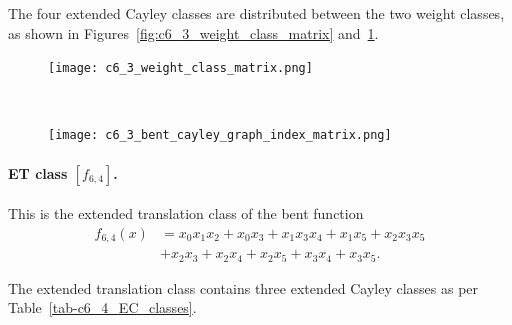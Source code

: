 \documentclass[12pt,a4paper]{article}
\begin{document}
The four extended Cayley classes are distributed between the two weight classes,
as shown in Figures~\ref{fig:c6_3_weight_class_matrix} and~\ref{fig:c6_3_bent_cayley_graph_index_matrix}.

\begin{figure}[!bhpt] %
\centering
\begin{minipage}{.48\textwidth}
  \centering
  \texttt{[image: c6\_3\_weight\_class\_matrix.png]}
  \label{fig:c6_3_weight_class_matrix}
\end{minipage}%
~~~~
\begin{minipage}{.48\textwidth}
  \centering
  \texttt{[image: c6\_3\_bent\_cayley\_graph\_index\_matrix.png]}
  \label{fig:c6_3_bent_cayley_graph_index_matrix}
\end{minipage}
\end{figure}


\paragraph*{ET class $[f_{6,4}]$.}
%
This is the extended translation class of the bent function
\begin{align*}
f_{6,4}(x) &= x_{0} x_{1} x_{2} + x_{0} x_{3} + x_{1} x_{3} x_{4} + x_{1} x_{5} + x_{2} x_{3} x_{5}
\\
           &+ x_{2} x_{3} + x_{2} x_{4} + x_{2} x_{5} + x_{3} x_{4} + x_{3} x_{5}.
\end{align*}

The extended translation class contains three extended Cayley classes as per Table~\ref{tab-c6_4_EC_classes}.
\end{document}
